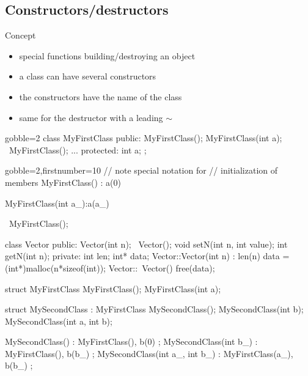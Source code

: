 \subsection[Constructors]{Constructors/destructors}

\begin{frame}[fragile]
  \begin{block}{Concept}
    \begin{itemize}
    \item special functions building/destroying an object
    \item a class can have several constructors
    \item the constructors have the name of the class
    \item same for the destructor with a leading $\sim$
    \end{itemize}
  \end{block}
  \begin{multicols}{2}
    \begin{cppcode*}{gobble=2}
      class MyFirstClass {
      public:
        MyFirstClass();
        MyFirstClass(int a);
        ~MyFirstClass();
        ...
      protected:
        int a;
      };
    \end{cppcode*}
    \columnbreak
    \begin{cppcode*}{gobble=2,firstnumber=10}
      // note special notation for
      // initialization of members
      MyFirstClass() : a(0) {}
      
      MyFirstClass(int a_):a(a_) {}

      ~MyFirstClass(){};
    \end{cppcode*}
  \end{multicols}
\end{frame}


\begin{frame}[fragile]
  \begin{cppcode}
    class Vector {
    public:
      Vector(int n);
      ~Vector();
      void setN(int n, int value);
      int getN(int n);
    private:
      int len;
      int* data;
    }
    Vector::Vector(int n) : len(n) {
      data = (int*)malloc(n*sizeof(int));
    }
    Vector::~Vector() {
      free(data);
    }
  \end{cppcode}
\end{frame}

\begin{frame}[fragile]
  \begin{cppcode}
    struct MyFirstClass {
      MyFirstClass();
      MyFirstClass(int a);
    }

    struct MySecondClass : MyFirstClass {
      MySecondClass();
      MySecondClass(int b);
      MySecondClass(int a, int b);
    }

    MySecondClass() : MyFirstClass(), b(0) {};
    MySecondClass(int b_) : MyFirstClass(), b(b_) {};
    MySecondClass(int a_,
                  int b_) : MyFirstClass(a_), b(b_) {};
  \end{cppcode}
\end{frame}


